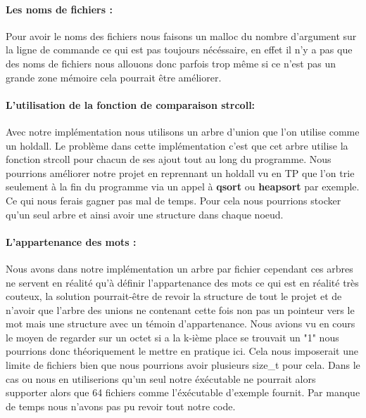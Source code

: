 \documentclass{article}
\begin{document}
\paragraph{Les noms de fichiers :} Pour avoir le noms des fichiers nous faisons un malloc du nombre d'argument sur la ligne de commande
ce qui est pas toujours nécéssaire, en effet il n'y a pas que des noms de fichiers nous allouons donc parfois trop même si ce n'est pas 
un grande zone mémoire cela pourrait être améliorer.

\paragraph{L'utilisation de la fonction de comparaison strcoll:} Avec notre implémentation nous utilisons un arbre d'union que l'on utilise comme un holdall.
Le problème dans cette implémentation c'est que cet arbre utilise la fonction strcoll pour chacun de ses ajout tout au long du programme.
Nous pourrions améliorer notre projet en reprennant un holdall vu en TP que l'on trie seulement à la fin du programme via un appel à \textbf{qsort} ou \textbf{heapsort} par exemple.
Ce qui nous ferais gagner pas mal de temps. Pour cela nous pourrions stocker qu'un seul arbre 
et ainsi avoir une structure dans chaque noeud.

\paragraph{L'appartenance des mots :}
Nous avons dans notre implémentation un arbre par fichier cependant ces arbres ne servent en réalité qu'à définir l'appartenance des mots
ce qui est en réalité très couteux, la solution pourrait-être de revoir la structure de tout le projet et de n'avoir que l'arbre des unions
ne contenant cette fois non pas un pointeur vers le mot mais une structure avec un témoin d'appartenance. Nous avions vu en cours le moyen de
regarder sur un octet si a la k-ième place se trouvait un "1" nous pourrions donc théoriquement le mettre en pratique ici. Cela nous imposerait une
limite de fichiers bien que nous pourrions avoir plusieurs size\_t pour cela. Dans le cas ou nous en utiliserions qu'un seul notre éxécutable ne pourrait
alors supporter alors que 64 fichiers comme l'éxécutable d'exemple fournit. Par manque de temps nous n'avons pas pu revoir tout notre code.
\end{document}
